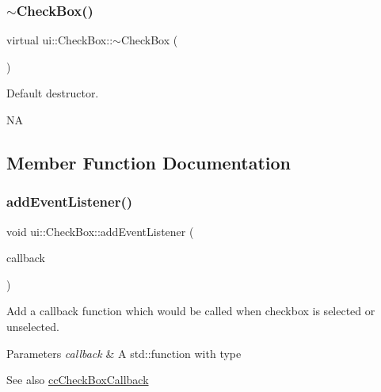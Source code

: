 \subsubsection{\texorpdfstring{$\sim$\+Check\+Box()}{~CheckBox()}\hspace{0.1cm}{\footnotesize\ttfamily [2/2]}}
{\footnotesize\ttfamily virtual ui\+::\+Check\+Box\+::$\sim$\+Check\+Box (\begin{DoxyParamCaption}{ }\end{DoxyParamCaption})\hspace{0.3cm}{\ttfamily [virtual]}}

Default destructor.

NA 

\subsection{Member Function Documentation}
\mbox{\label{classui_1_1CheckBox_a11c1b9cd5d7314a980f994977f960822}} 
\subsubsection{\texorpdfstring{add\+Event\+Listener()}{addEventListener()}\hspace{0.1cm}{\footnotesize\ttfamily [1/2]}}
{\footnotesize\ttfamily void ui\+::\+Check\+Box\+::add\+Event\+Listener (\begin{DoxyParamCaption}\item[{const \hyperlink{classui_1_1CheckBox_ad210762967d1b444f5cf94f5e7450c56}{cc\+Check\+Box\+Callback} \&}]{callback }\end{DoxyParamCaption})}

Add a callback function which would be called when checkbox is selected or unselected. 
\begin{DoxyParams}{Parameters}
{\em callback} & A std\+::function with type \\
\hline
\end{DoxyParams}
\begin{DoxySeeAlso}{See also}
{\ttfamily \hyperlink{classui_1_1CheckBox_ad210762967d1b444f5cf94f5e7450c56}{cc\+Check\+Box\+Callback}} 
\end{DoxySeeAlso}
\mbox{\label{classui_1_1CheckBox_a11c1b9cd5d7314a980f994977f960822}} 
